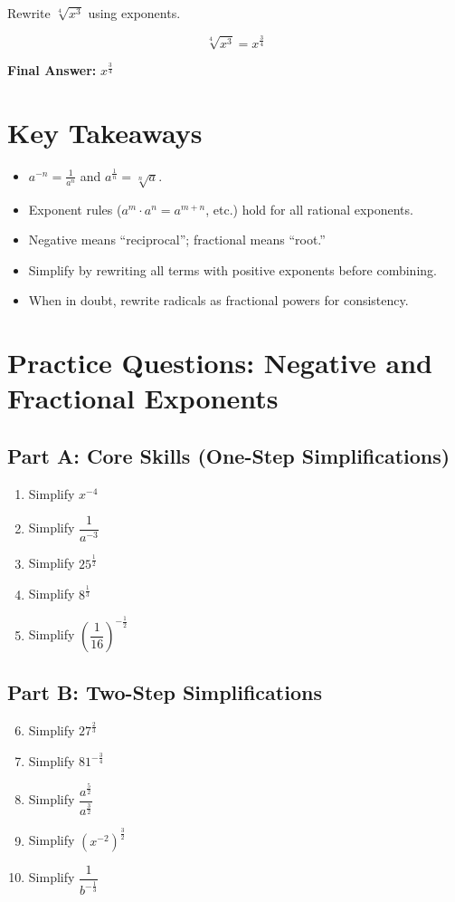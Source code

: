 \documentclass[12pt]{article}
\begin{document}
Rewrite \(\sqrt[4]{x^3}\) using exponents.

\[
\sqrt[4]{x^3} = x^{\frac{3}{4}}
\]

\textbf{Final Answer:} \(\boxed{x^{\frac{3}{4}}}\)

\section*{Key Takeaways}
\begin{itemize}
  \item \(a^{-n} = \frac{1}{a^n}\) and \(a^{\frac{1}{n}} = \sqrt[n]{a}\).
  \item Exponent rules (\(a^m \cdot a^n = a^{m+n}\), etc.) hold for all rational exponents.
  \item Negative means “reciprocal”; fractional means “root.”
  \item Simplify by rewriting all terms with positive exponents before combining.
  \item When in doubt, rewrite radicals as fractional powers for consistency.
\end{itemize}

\newpage


\section*{Practice Questions: Negative and Fractional Exponents}

\subsection*{Part A: Core Skills (One-Step Simplifications)}
\begin{enumerate}
  \item Simplify \(x^{-4}\)
  \item Simplify \(\dfrac{1}{a^{-3}}\)
  \item Simplify \(25^{\frac{1}{2}}\)
  \item Simplify \(8^{\frac{1}{3}}\)
  \item Simplify \(\left(\dfrac{1}{16}\right)^{-\frac{1}{2}}\)
\end{enumerate}

\subsection*{Part B: Two-Step Simplifications}
\begin{enumerate}
  \setcounter{enumi}{5}
  \item Simplify \(27^{\frac{2}{3}}\)
  \item Simplify \(81^{-\frac{3}{4}}\)
  \item Simplify \(\dfrac{a^{\frac{5}{2}}}{a^{\frac{3}{2}}}\)
  \item Simplify \((x^{-2})^{\frac{3}{2}}\)
  \item Simplify \(\dfrac{1}{b^{-\frac{1}{3}}}\)
\end{enumerate}
\end{document}
